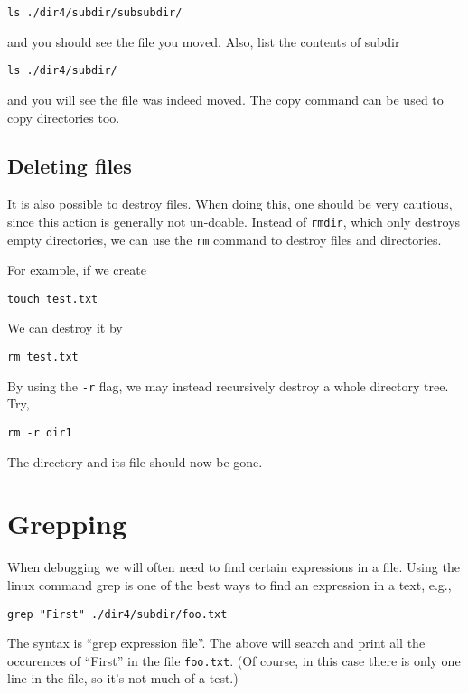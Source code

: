 \documentclass[aps,showpacs,prd,notitlepage,preprintnumbers,amsmath,amssymb,letterpaper]{revtex4}
\begin{document}
\begin{verbatim}
ls ./dir4/subdir/subsubdir/
\end{verbatim}

and you should see the file you moved. Also, list the contents of subdir

\begin{verbatim}
ls ./dir4/subdir/
\end{verbatim}

and you will see the file was indeed moved. The copy command can be
used to copy directories too.

\subsection{Deleting files}
It is also possible to destroy files.
When doing this, one should be very cautious, since this action is generally not un-doable.
Instead of \verb|rmdir|, which only destroys empty directories, we can use the \verb|rm| command to destroy files and directories.

For example, if we create
\begin{verbatim}
touch test.txt
\end{verbatim}

We can destroy it by
\begin{verbatim}
rm test.txt
\end{verbatim}

By using the \verb|-r| flag, we may instead recursively destroy a whole directory tree.
Try,

\begin{verbatim}
rm -r dir1
\end{verbatim}

The directory and its file should now be gone.

\section{Grepping}

When debugging we will often need to find certain expressions in a file. Using the linux command
grep is one of the best ways to find an expression in a text, e.g.,

\begin{verbatim}
grep "First" ./dir4/subdir/foo.txt
\end{verbatim}

The syntax is ``grep expression file''. The above will search and
print all the occurences of ``First'' in the file
\verb|foo.txt|.
(Of course, in this case there is only one line in the file, so it's not much of a test.)
\end{document}
